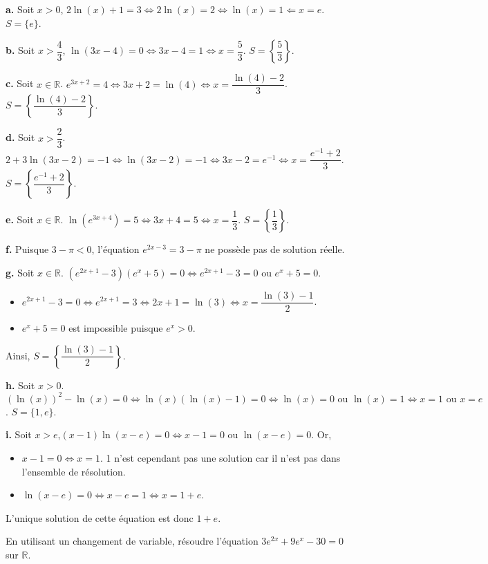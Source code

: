 \documentclass[11pt,fleqn, openany]{book} %
\begin{document}
\begin{solution}
\textbf{a.} Soit $x>0$, $2\ln(x)+1=3 \Leftrightarrow 2\ln(x)=2 \Leftrightarrow \ln(x)=1 \Leftarrow x =e$. $S=\{e\}$.

\textbf{b.} Soit $x> \dfrac{4}{3}$, $\ln(3x-4)=0 \Leftrightarrow 3x-4=1 \Leftrightarrow x=\dfrac{5}{3}$. $S=\left\{\dfrac{5}{3}\right\}$.

\textbf{c.} Soit $x\in\mathbb{R}$. $e^{3x+2}=4 \Leftrightarrow 3x+2=\ln(4) \Leftrightarrow x=\dfrac{\ln(4)-2}{3}$. $S=\left\{\dfrac{\ln(4)-2}{3}\right\}$.

\textbf{d.} Soit $x > \dfrac{2}{3}$. $2+3\ln(3x-2)=-1 \Leftrightarrow \ln(3x-2)=-1 \Leftrightarrow 3x-2 =e^{-1} \Leftrightarrow x =\dfrac{e^{-1}+2}{3}$. $S=\left\{\dfrac{e^{-1}+2}{3}\right\}$.

\textbf{e.} Soit $x\in \mathbb{R}$. $\ln(e^{3x+4})=5 \Leftrightarrow 3x+4=5 \Leftrightarrow x= \dfrac{1}{3}$. $S=\left\{\dfrac{1}{3}\right\}$.

\textbf{f.} Puisque $3-\pi <0$, l'équation $e^{2x-3}=3-\pi$ ne possède pas de solution réelle.

\textbf{g.} Soit $x\in \mathbb{R}$. $(e^{2x+1}-3)(e^x+5)=0 \Leftrightarrow e^{2x+1}-3=0  \text{ ou } e^x+5=0$.
\begin{itemize}
\item $e^{2x+1}-3=0 \Leftrightarrow e^{2x+1}=3 \Leftrightarrow 2x+1=\ln(3) \Leftrightarrow x=\dfrac{\ln(3)-1}{2}$.
\item $e^x+5=0$ est impossible puisque $e^x>0$.
\end{itemize}
Ainsi, $S=\left\{ \dfrac{\ln(3)-1}{2}\right\}$.

\textbf{h.} Soit $x>0$. $(\ln(x))^2-\ln(x)=0 \Leftrightarrow \ln(x) (\ln(x)-1)=0 \Leftrightarrow \ln(x)=0 \text{ ou } \ln(x)=1 \Leftrightarrow x=1 \text{ ou } x=e$. $S=\{1,e\}$.

\textbf{i.} Soit \(x>e\),\((x-1)\ln(x-e)=0 \Leftrightarrow x-1=0\) ou \(\ln(x-e)=0\). Or,
\begin{itemize}
\item \(x-1 = 0\Leftrightarrow x=1\). 1 n'est cependant pas une solution car il n'est pas dans l'ensemble de résolution.
\item \(\ln(x-e)=0 \Leftrightarrow x-e=1 \Leftrightarrow x=1+e\).\end{itemize}
L'unique solution de cette équation est donc \(1+e\).
\end{solution}



\begin{exercise}En utilisant un changement de variable, résoudre l'équation $3e^{2x}+9e^x-30=0$ sur $\mathbb{R}$.\end{exercise}
\end{document}
